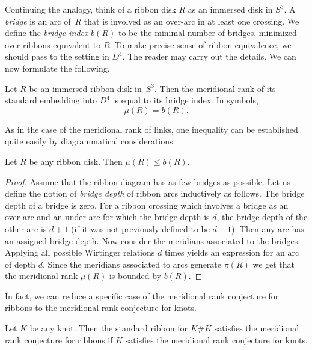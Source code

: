 \documentclass[main.tex]{subfiles}
\begin{document}
Continuing the analogy, think of a ribbon disk $R$ as an immersed disk in $S^3$. A \textit{bridge} is an arc of~$R$ that is involved as an over-arc in at least one crossing. We define the \textit{bridge index} $b(R)$ to be the minimal number of bridges, minimized over ribbons equivalent to $R$. To make precise sense of ribbon equivalence, we should pass to the setting in $D^4$. The reader may carry out the details. We can now formulate the following.

\begin{conjecture}
Let $R$ be an immersed ribbon disk in~$S^3$. Then the meridional rank of its standard embedding into $D^4$ is equal to its bridge index. In symbols, $$\mu(R) = b(R).$$
\end{conjecture}

As in the case of the meridional rank of links, one inequality can be established quite easily by diagrammatical considerations.

\begin{proposition}\label{conj:meribbonal-rank-easy}
Let $R$ be any ribbon disk. Then $\mu(R) \leq b(R)$.
\end{proposition}

\begin{proof}
Assume that the ribbon diagram has as few bridges as possible.
Let us define the notion of \textit{bridge depth} of ribbon arcs inductively as follows. The bridge depth of a bridge is zero. For a ribbon crossing which involves a bridge as an over-arc and an under-arc for which the bridge depth is $d$, the bridge depth of the other arc is $d + 1$ (if it was not previously defined to be $d-1$). Then any arc has an assigned bridge depth. Now consider the meridians associated to the bridges. Applying all possible Wirtinger relations $d$ times yields an expression for an arc of depth $d$. Since the meridians associated to arcs generate $\pi(R)$ we get that the meridional rank $\mu(R)$ is bounded by $b(R)$.
\end{proof}

In fact, we can reduce a specific case of the meridional rank conjecture for ribbons to the meridional rank conjecture for knots.

\begin{theorem}
Let $K$ be any knot. Then the standard ribbon for $K \# \bar{K}$ satisfies the meridional rank conjecture for ribbons if $K$ satisfies the meridional rank conjecture for knots.
\end{theorem}
\end{document}
